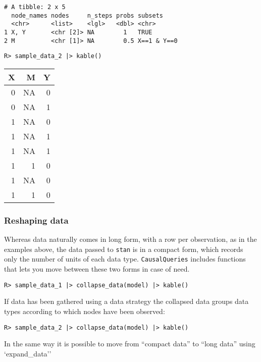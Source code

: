 \documentclass[
  11pt,
  article]{jss}
\begin{document}
\begin{verbatim}
# A tibble: 2 x 5
  node_names nodes     n_steps probs subsets    
  <chr>      <list>    <lgl>   <dbl> <chr>      
1 X, Y       <chr [2]> NA        1   TRUE       
2 M          <chr [1]> NA        0.5 X==1 & Y==0
\end{verbatim}

\begin{verbatim}
R> sample_data_2 |> kable()
\end{verbatim}

\begin{tabular}{r|r|r}
\hline
X & M & Y\\
\hline
0 & NA & 0\\
\hline
0 & NA & 1\\
\hline
1 & NA & 0\\
\hline
1 & NA & 1\\
\hline
1 & NA & 1\\
\hline
1 & 1 & 0\\
\hline
1 & NA & 0\\
\hline
1 & 1 & 0\\
\hline
\end{tabular}

\hypertarget{reshaping-data}{%
\subsubsection{Reshaping data}\label{reshaping-data}}

Whereas data naturally comes in long form, with a row per observation,
as in the examples above, the data passed to \texttt{stan} is in a
compact form, which records only the number of units of each data type.
\texttt{CausalQueries} includes functions that lets you move between
these two forms in case of need.

\begin{verbatim}
R> sample_data_1 |> collapse_data(model) |> kable()
\end{verbatim}

If data has been gathered using a data strategy the collapsed data
groups data types according to which nodes have been observed:

\begin{verbatim}
R> sample_data_2 |> collapse_data(model) |> kable()
\end{verbatim}

In the same way it is possible to move from ``compact data'' to ``long
data'' using `expand\_data''
\end{document}
